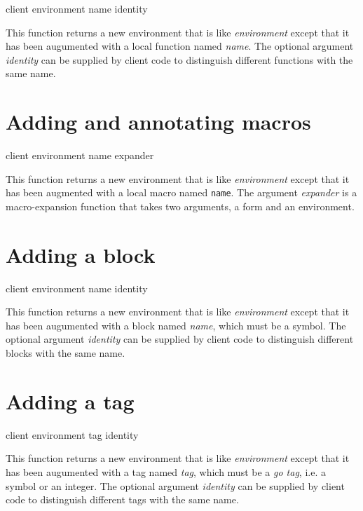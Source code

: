  {client environment name \optional identity}

This function returns a new environment that is like
\textit{environment} except that it has been augumented with a local
function named \textit{name}.  The optional argument \textit{identity}
can be supplied by client code to distinguish different functions with
the same name.

\section{Adding and annotating macros}

 {client environment name expander}

This function returns a new environment that is like
\textit{environment} except that it has been augmented with a local
macro named \texttt{name}.  The argument \textit{expander} is a
macro-expansion function that takes two arguments, a form and an
environment.

\section{Adding a block}

 {client environment name \optional identity}

This function returns a new environment that is like
\textit{environment} except that it has been augumented with a block
named \textit{name}, which must be a symbol.  The optional argument
\textit{identity} can be supplied by client code to distinguish
different blocks with the same name.

\section{Adding a tag}

 {client environment tag \optional identity}

This function returns a new environment that is like
\textit{environment} except that it has been augumented with a tag
named \textit{tag}, which must be a \emph{go tag}, i.e. a symbol or an
integer.  The optional argument \textit{identity} can be supplied by
client code to distinguish different tags with the same name.

